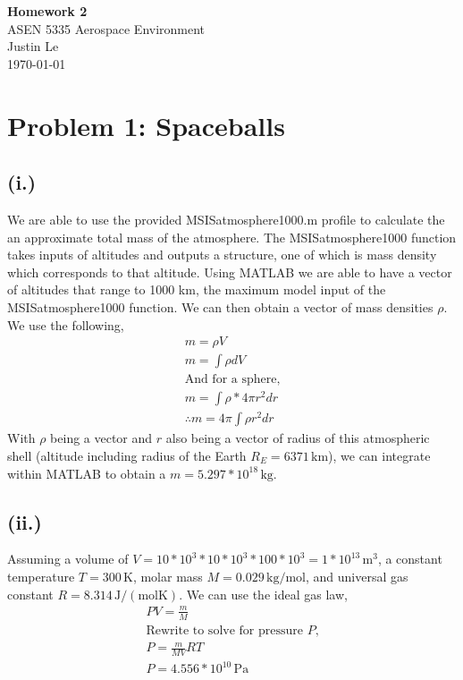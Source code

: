 \documentclass[11pt]{article}
\begin{document}
\begin{center}
    {\Large \textbf{Homework 2}}\\[0.5em]
    {\large ASEN 5335 Aerospace Environment}\\[0.5em]
    Justin Le\\
    \today
    \\[0.5em]
\end{center}

\vspace{1em}

\section*{Problem 1: Spaceballs}
\subsection*{(i.)}
\hspace*{2em}We are able to use the provided MSISatmosphere1000.m profile to calculate the
an approximate total mass of the atmosphere. The MSISatmosphere1000 function
takes inputs of altitudes and outputs a structure, one of which is mass density which
corresponds to that altitude. Using MATLAB we are able to have a vector of altitudes that
range to 1000 km, the maximum model input of the MSISatmosphere1000 function. We can then
obtain a vector of mass densities $\rho$. We use the following,
\[
\begin{gathered}
m = \rho V \\
m = \int{\rho dV} \\
\text{And for a sphere,} \\
m = \int{\rho*4\pi r^2 dr} \\
\therefore m = 4\pi\int{\rho r^2dr}
\end{gathered}
\]
\hspace*{2em}With $\rho$ being a vector and $r$ also being a vector of radius of this atmospheric
shell (altitude including radius of the Earth $R_E = 6371 \, \mathrm{km}$), we can integrate
within MATLAB to obtain a $\boxed{m=5.297*10^{18}\,\mathrm{kg}}$.
\subsection*{(ii.)}
\hspace*{2em}Assuming a volume of $V = 10*10^3*10*10^3*100*10^3 = 1*10^{13} \, \mathrm{m^3}$, a constant temperature $T = 300 \, \mathrm{K}$, molar mass $M = 0.029 \, \mathrm{kg/mol}$,
and universal gas constant $R = 8.314 \, \mathrm{J/(molK)}$. We can use the ideal gas law,
\[
\begin{gathered}
PV = \frac{m}{M}\\
\text{Rewrite to solve for pressure $P$,} \\
P = \frac{m}{MV}RT \\
\boxed{P = 4.556*10^{10} \, \mathrm{Pa}}
\end{gathered}
\]
\end{document}
